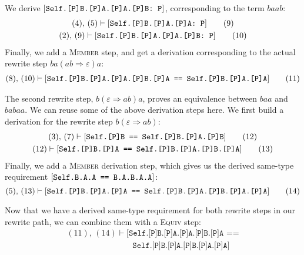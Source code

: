 \documentclass[../generics]{subfiles}
\begin{document}
We derive $[\texttt{Self.[P]B.[P]A.[P]A.[P]B:~P}]$, corresponding to the term $baab$:
\begin{gather*}
(4),\,(5)\vdash[\texttt{Self.[P]B.[P]A.[P]A:~P}]\tag{9}\\
(2),\,(9)\vdash[\texttt{Self.[P]B.[P]A.[P]A.[P]B:~P}]\tag{10}
\end{gather*}
Finally, we add a \textsc{Member} step, and get a derivation corresponding to the actual rewrite step $ba(ab\Rightarrow\varepsilon)a$:
\begin{gather*}
(8),\,(10)\vdash[\texttt{Self.[P]B.[P]A.[P]A.[P]B.[P]A == Self.[P]B.[P]A.[P]A}]\tag{11}
\end{gather*}

The second rewrite step, $b(\varepsilon\Rightarrow ab)a$, proves an equivalence between $baa$ and $babaa$. We can reuse some of the above derivation steps here. We first build a derivation for the rewrite step $b(\varepsilon\Rightarrow ab)$:
\begin{gather*}
(3),\,(7)\vdash[\texttt{Self.[P]B == Self.[P]B.[P]A.[P]B}]\tag{12}\\
(12)\vdash[\texttt{Self.[P]B.[P]A == Self.[P]B.[P]A.[P]B.[P]A}]\tag{13}
\end{gather*}
Finally, we add a \textsc{Member} derivation step, which gives us the derived same-type requirement $[\texttt{Self.B.A.A == B.A.B.A.A}]$:
\[
(5),\,(13)\vdash[\texttt{Self.[P]B.[P]A.[P]A == Self.[P]B.[P]A.[P]B.[P]A.[P]A}]\tag{14}
\]

Now that we have a derived same-type requirement for both rewrite steps in our rewrite path, we can combine them with a \textsc{Equiv} step:
\begin{gather*}
(11),\,(14)\vdash[\texttt{Self.[P]B.[P]A.[P]A.[P]B.[P]A ==}\\
\qquad\qquad\qquad\qquad\texttt{Self.[P]B.[P]A.[P]B.[P]A.[P]A}]\tag{15}
\end{gather*}
\end{document}
